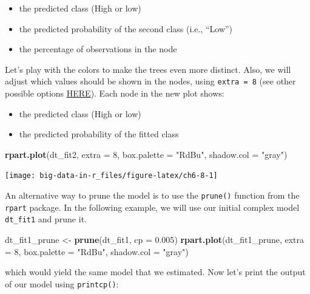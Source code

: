 \documentclass[]{book}
\newenvironment{Shaded}{\begin{snugshade}}{\end{snugshade}}
\newcommand{\DataTypeTok}[1]{\textcolor[rgb]{0.13,0.29,0.53}{#1}}
\newcommand{\DecValTok}[1]{\textcolor[rgb]{0.00,0.00,0.81}{#1}}
\newcommand{\FloatTok}[1]{\textcolor[rgb]{0.00,0.00,0.81}{#1}}
\newcommand{\KeywordTok}[1]{\textcolor[rgb]{0.13,0.29,0.53}{\textbf{#1}}}
\newcommand{\NormalTok}[1]{#1}
\newcommand{\StringTok}[1]{\textcolor[rgb]{0.31,0.60,0.02}{#1}}
\providecommand{\tightlist}{%
  \setlength{\itemsep}{0pt}\setlength{\parskip}{0pt}}
\begin{document}
\begin{itemize}
\tightlist
\item
  the predicted class (High or low)
\item
  the predicted probability of the second class (i.e., ``Low'')
\item
  the percentage of observations in the node
\end{itemize}

Let's play with the colors to make the trees even more distinct. Also, we will adjust which values should be shown in the nodes, using \texttt{extra\ =\ 8} (see other possible options \href{http://www.milbo.org/doc/prp.pdf}{HERE}). Each node in the new plot shows:

\begin{itemize}
\tightlist
\item
  the predicted class (High or low)
\item
  the predicted probability of the fitted class
\end{itemize}

\begin{Shaded}
\begin{Highlighting}[]
\KeywordTok{rpart.plot}\NormalTok{(dt_fit2, }\DataTypeTok{extra =} \DecValTok{8}\NormalTok{, }\DataTypeTok{box.palette =} \StringTok{"RdBu"}\NormalTok{, }\DataTypeTok{shadow.col =} \StringTok{"gray"}\NormalTok{)}
\end{Highlighting}
\end{Shaded}

\texttt{[image: big-data-in-r\_files/figure-latex/ch6-8-1]}

An alternative way to prune the model is to use the \texttt{prune()} function from the \texttt{rpart} package. In the following example, we will use our initial complex model \texttt{dt\_fit1} and prune it.

\begin{Shaded}
\begin{Highlighting}[]
\NormalTok{dt_fit1_prune <-}\StringTok{ }\KeywordTok{prune}\NormalTok{(dt_fit1, }\DataTypeTok{cp =} \FloatTok{0.005}\NormalTok{)}
\KeywordTok{rpart.plot}\NormalTok{(dt_fit1_prune, }\DataTypeTok{extra =} \DecValTok{8}\NormalTok{, }\DataTypeTok{box.palette =} \StringTok{"RdBu"}\NormalTok{, }\DataTypeTok{shadow.col =} \StringTok{"gray"}\NormalTok{)}
\end{Highlighting}
\end{Shaded}

which would yield the same model that we estimated. Now let's print the output of our model using \texttt{printcp()}:
\end{document}
